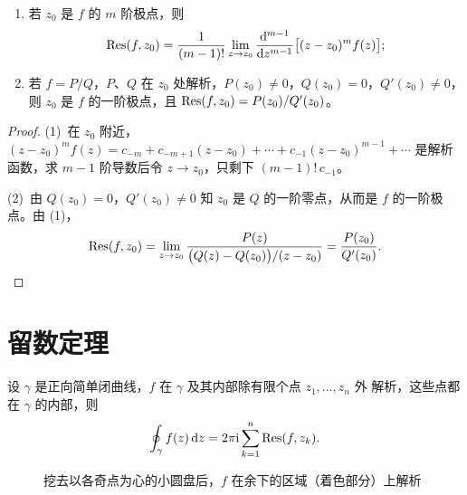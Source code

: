\documentclass{mojing-notes}
\begin{document}
\begin{proposition}\label{prop:residue-pole}
\begin{enumerate}
  \item 若 $z_0$ 是 $f$ 的 $m$ 阶极点，则
        \[
          \operatorname{Res}(f,z_0)=\frac{1}{(m-1)!}\lim_{z\to z_0}
          \frac{\mathop{}\!\mathrm{d}^{m-1}}{\mathop{}\!\mathrm{d} z^{m-1}}\bigl[(z-z_0)^mf(z)\bigr];
        \]
  \item 若 $f=P/Q$，$P$、$Q$ 在 $z_0$ 处解析，$P(z_0)\ne0$，$Q(z_0)=0$，$Q'(z_0)\ne0$，
        则 $z_0$ 是 $f$ 的一阶极点，且 $\operatorname{Res}(f,z_0)=P(z_0)/Q'(z_0)$。
\end{enumerate}
\end{proposition}

\begin{proof}
(1)~在 $z_0$ 附近，$(z-z_0)^mf(z)=c_{-m}+c_{-m+1}(z-z_0)+\dotsb+c_{-1}(z-z_0)^{m-1}+\dotsb$
是解析函数，求 $m-1$ 阶导数后令 $z\to z_0$，只剩下 $(m-1)!\,c_{-1}$。

(2)~由 $Q(z_0)=0$，$Q'(z_0)\ne0$ 知 $z_0$ 是 $Q$ 的一阶零点，从而是 $f$ 的一阶极点。由 (1)，
\[
  \operatorname{Res}(f,z_0)=\lim_{z\to z_0}\frac{P(z)}{\bigl(Q(z)-Q(z_0)\bigr)/(z-z_0)}=\frac{P(z_0)}{Q'(z_0)}. \qedhere
\]
\end{proof}

\section{留数定理}

\begin{theorem}[留数定理]\label{thm:residue}
设 $\gamma$ 是正向简单闭曲线，$f$ 在 $\gamma$ 及其内部除有限个点 $z_1,\dotsc,z_n$ 外
解析，这些点都在 $\gamma$ 的内部，则
\begin{equation}\label{eq:residue}
  \oint_\gamma f(z)\mathop{}\!\mathrm{d} z=2\pi\mathrm{i}\sum_{k=1}^n\operatorname{Res}(f,z_k).
\end{equation}
\end{theorem}

\begin{figure}[htbp]
\centering
{}
\caption{挖去以各奇点为心的小圆盘后，$f$ 在余下的区域（着色部分）上解析}
\label{fig:residue}
\end{figure}
\end{document}

